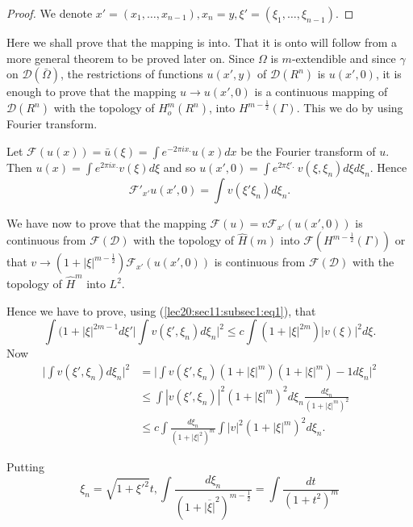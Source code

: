 \begin{proof} %
  We denote $x' = (x_1, \ldots , x_{n-1}), x_n = y, \xi' = (\xi_1,
  \ldots , \xi_{n - 1})$.  
\end{proof}

Here we shall prove that the mapping is into. That it is onto will
follow from a more general theorem to be proved later on. Since
$\Omega$ is $m$-extendible and since $\gamma$ on $ \mathscr{D}
(\bar{\Omega})$, the restrictions of functions $u (x', y)$ of
$\mathscr{D} (R^n) $ is $u (x', 0)$, it is enough to prove that the
mapping $u \to u (x', 0)$ is a continuous mapping of
$\mathscr{D}(R^n)$ with the topology of $H^m_o(R^n)$, into $H^{m -
  \frac{1}{2}} (\Gamma)$. This we do by using Fourier transform.  

Let $\mathscr{F} (u(x)) = \bar{u} (\xi) = \int e^{-2 \pi i x. } u (x)
dx$ be the Fourier transform of $u$. Then $u(x) = \int e^{2 \pi ix. }
v (\xi ) d \xi$ and so $u (x', 0) = \int e^{2 \pi \xi'. } ~ v(\xi,
\xi_n) d \xi d \xi_n$. Hence  
\begin{equation*}
\mathscr{F}'_{x'} u (x', 0) = \int v(\xi' \xi_n) d \xi_n. \tag{1}\label{lec20:sec11:subsec1:eq1}
\end{equation*}

We have now to prove that the mapping $\mathscr{F} (u) = v
\mathscr{F}_{x'} (u(x', 0))$ is continuous from $\mathscr{F}
(\mathscr{D})$ with the topology of $\hat{H}(m)$ into $\mathscr{F}
(H^{m - \frac{1}{2}} (\Gamma))$ or that $v \to (1 + | \xi |^{m -
  \frac{1}{2}}) \mathscr{F}_{x'} (u (x', 0))$ is continuous from
$\mathscr{F} (\mathscr{D})$ with the topology of $\hat{H}^m $ into
$L^2$.  

Hence we have to prove, using (\ref{lec20:sec11:subsec1:eq1}), that
$$
\int (1 + | \xi | ^{2m-1} d \xi' \Big| \int v (\xi', \xi_n ) d \xi_n
\Big |^2 \leq c \int (1 + | \xi |^{2m}) | v (\xi) \big|^2 d \xi.  
$$
Now\pageoriginale 
\begin{align*}
  \Big | \int v (\xi' , \xi_n ) d \xi_n \Big |^2 & = \Big | \int v (\xi'
  , \xi_n ) (1+ |\xi|^m) (1 + |\xi|^m) -1 d \xi _n |^2\\ 
  & \leq \int | v (\xi', \xi_n) |^2 ( 1 + |\xi |^m)^2 d \xi_n \frac{d
    \xi_n }{(1 + |\xi|^m)^2}\\ 
  & \leq c \int \frac{d \xi_n}{(1 + | \xi |^2 )^m} \int |v|^2 (1 + |\xi
  |^m )^2 d \xi_n. \tag{2}\label{lec20:sec11:subsec1:eq2} 
\end{align*}

Putting
\begin{equation}
   \xi_n = \sqrt {1 + \xi'^{2}} t, \int \frac{d
    \xi_n}{(1+ \overline{|\xi|}^2)^{m - \frac{1}{2}}} =\int \frac{dt}{(1 +
    t^2)^m} \tag{3}\label{lec20:sec11:subsec1:eq3} 
\end{equation}

